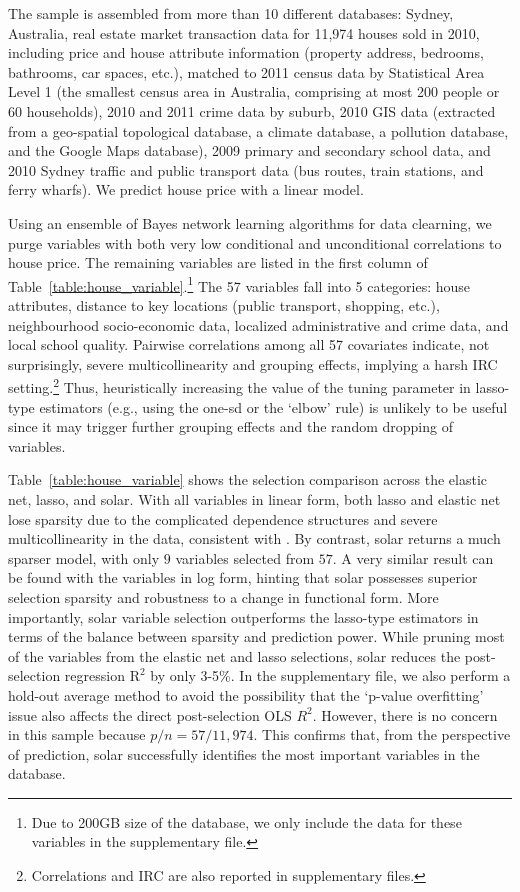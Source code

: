 \documentclass[12pt]{article}
\begin{document}
The sample is assembled from more than 10 different databases: Sydney, Australia, real estate market transaction data for 11,974 houses sold in 2010, including price and house attribute information (property address, bedrooms, bathrooms, car spaces, etc.), matched to 2011 census data by Statistical Area Level 1 (the smallest census area in Australia, comprising at most 200 people or 60 households), 2010 and 2011 crime data by suburb, 2010 GIS data (extracted from a geo-spatial topological database, a climate database, a pollution database, and the Google Maps database), 2009 primary and secondary school data, and 2010 Sydney traffic and public transport data (bus routes, train stations, and ferry wharfs). We predict house price with a linear model.

Using an ensemble of Bayes network learning algorithms for data clearning, we purge variables with both very low conditional and unconditional correlations to house price. The remaining variables are listed in the first column of Table~\ref{table:house_variable}.\footnote{Due to 200GB size of the database, we only include the data for these variables in the supplementary file.} The 57 variables fall into 5 categories: house attributes, distance to key locations (public transport, shopping, etc.), neighbourhood socio-economic data, localized administrative and crime data, and local school quality. Pairwise correlations among all 57 covariates indicate, not surprisingly, severe multicollinearity and grouping effects, implying a harsh IRC setting.\footnote{Correlations and IRC are also reported in supplementary files.} Thus, heuristically increasing the value of the tuning parameter in lasso-type estimators (e.g., using the one-sd or the `elbow' rule) is unlikely to be useful since it may trigger further grouping effects and the random dropping of variables.

Table~\ref{table:house_variable} shows the selection comparison across the elastic net, lasso, and solar. With all variables in linear form, both lasso and elastic net lose sparsity due to the complicated dependence structures and severe multicollinearity in the data, consistent with \citet{jia2010model}. By contrast, solar returns a much sparser model, with only $9$ variables selected from $57$. A very similar result can be found with the variables in log form, hinting that solar possesses superior selection sparsity and robustness to a change in functional form. More importantly, solar variable selection outperforms the lasso-type estimators in terms of the balance between sparsity and prediction power. While pruning most of the variables from the elastic net and lasso selections, solar reduces the post-selection regression $\mathrm{R}^2$ by only 3-5\%. In the supplementary file, we also perform a hold-out average method to avoid the possibility that the `p-value overfitting' issue also affects the direct post-selection OLS $R^2$. However, there is no concern in this sample because $p/n=57/11,974$. This confirms that, from the perspective of prediction, solar successfully identifies the most important variables in the database.
\end{document}
